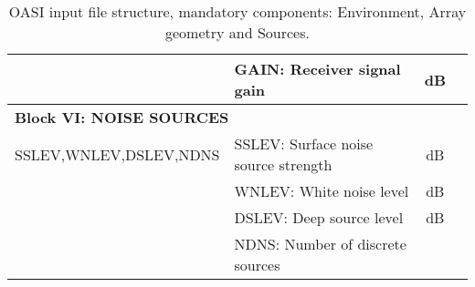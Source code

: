 \begin{table}
\begin{center}
\begin{tabular}{|l|l|c|c|}
	& GAIN: Receiver signal gain & dB & \\ 
\hline
\multicolumn{4}{|l|}{\bf Block VI: NOISE SOURCES}  \\ \hline
SSLEV,WNLEV,DSLEV,NDNS & SSLEV: Surface noise source strength & dB & \\
	& WNLEV: White noise level & dB & \\
	& DSLEV: Deep source level & dB & \\
	& NDNS: Number of discrete sources & & \\
\hline
\end{tabular}
\end{center}
\caption{OASI input file structure, mandatory components: Environment, 
Array geometry and Sources.
 \label{tab:oasiI} }
\end{table} 

